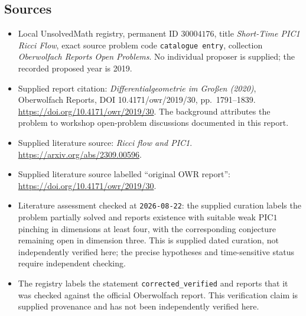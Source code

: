 \documentclass[11pt]{article}
\begin{document}
\subsection{Sources}
\begin{itemize}
\item Local UnsolvedMath registry, permanent ID \(30004176\), title \emph{Short-Time PIC1 Ricci Flow}, exact source problem code \texttt{catalogue entry}, collection \emph{Oberwolfach Reports Open Problems}. No individual proposer is supplied; the recorded proposed year is 2019.
\item Supplied report citation: \emph{Differentialgeometrie im Großen (2020)}, Oberwolfach Reports, DOI 10.4171/owr/2019/30, pp.\ 1791--1839. \url{https://doi.org/10.4171/owr/2019/30}. The background attributes the problem to workshop open-problem discussions documented in this report.
\item Supplied literature source: \emph{Ricci flow and PIC1}. \url{https://arxiv.org/abs/2309.00596}.
\item Supplied literature source labelled ``original OWR report'': \url{https://doi.org/10.4171/owr/2019/30}.
\item Literature assessment checked at \texttt{2026-08-22}: the supplied curation labels the problem partially solved and reports existence with suitable weak \(\mathrm{PIC1}\) pinching in dimensions at least four, with the corresponding conjecture remaining open in dimension three. This is supplied dated curation, not independently verified here; the precise hypotheses and time-sensitive status require independent checking.
\item The registry labels the statement \texttt{corrected\_verified} and reports that it was checked against the official Oberwolfach report. This verification claim is supplied provenance and has not been independently verified here.
\end{itemize}
\end{document}
